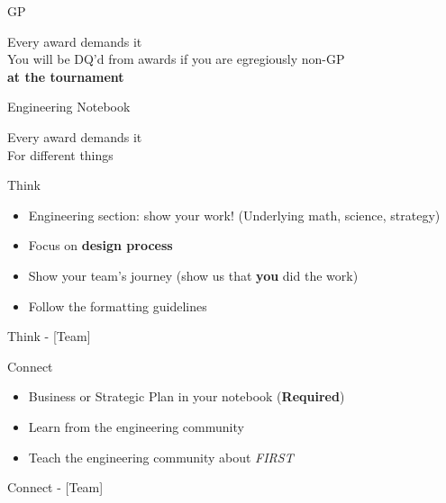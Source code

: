 \documentclass{beamer}
\begin{document}
  \begin{frame}{GP}
    \begin{center}
      \huge{Every award demands it}
      \\
      \pause
      \vspace{2em}
      \small{
        You will be DQ'd from awards if you are egregiously non-GP
        \\
        \textbf{at the tournament}
      }
    \end{center}
  \end{frame}

  \begin{frame}{Engineering Notebook}
    \begin{center}
      \huge{Every award demands it}
      \\
      \pause
      \vspace{2em}
      \small{For different things}
    \end{center}
  \end{frame}

  \begin{frame}{Think}
    \begin{itemize}
    \item Engineering section:
      show your work! (Underlying math, science, strategy) \pause
    \item Focus on \textbf{design process} \pause
    \item Show your team's journey
      (show us that \textbf{you} did the work) \pause
    \item Follow the formatting guidelines
    \end{itemize}
  \end{frame}

  \begin{frame}{Think - [Team]}
  \end{frame}

  \begin{frame}{Connect}
    \begin{itemize}
    \item Business or Strategic Plan in your notebook (\textbf{Required})\pause
    \item Learn from the engineering community \pause
    \item Teach the engineering community about \textit{FIRST}
    \end{itemize}
  \end{frame}

  \begin{frame}{Connect - [Team]}
  \end{frame}
\end{document}
